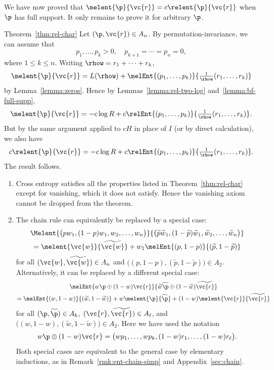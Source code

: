 We have now proved that $\melent{\p}{\vc{r}} = c\relent{\p}{\vc{r}}$ when
$\p$ has full support.  It only remains to prove it for arbitrary $\p$. 

\begin{pfof}{Theorem~\ref{thm:rel-char}}
Let $(\p, \vc{r}) \in A_n$.  By permutation-invariance, we can assume that 
\[
p_1, \ldots, p_k > 0, 
\quad
p_{k + 1} = \cdots = p_n = 0,
\]
where $1 \leq k \leq n$.  Writing $\rhow = r_1 + \cdots + r_k$,
\[
\melent{\p}{\vc{r}}     
=
L(\rhow) 
+ \melEnt{(p_1, \ldots, p_k)}{\tfrac{1}{\rhow}(r_1, \ldots, r_k)}
\]
by Lemma~\ref{lemma:zeros}.  Hence by Lemmas~\ref{lemma:rel-two-log}
and~\ref{lemma:bf-full-supp},
\[
\melent{\p}{\vc{r}}     
=
-c\log R
+ c\relEnt{(p_1, \ldots, p_k)}{\tfrac{1}{\rhow}(r_1, \ldots, r_k)}.
\]
But by the same argument applied to $cH$ in place of $I$ (or by direct
calculation), we also have
\[
c\relent{\p}{\vc{r}}     
=
-c\log R
+ c\relEnt{(p_1, \ldots, p_k)}{\tfrac{1}{\rhow}(r_1, \ldots, r_k)}.
\]
The result follows.
\end{pfof}

\begin{remarks}
\begin{enumerate}
\item 
Cross entropy satisfies all the properties listed in
Theorem~\ref{thm:rel-char} except for vanishing,
which it does not satisfy.  Hence the vanishing axiom cannot be dropped
from the theorem.

\item
{}
The chain%
%
% 
rule can equivalently be replaced by a special case: 
% 
\begin{multline*}
\Melent{\bigl(pw_1, (1 - p)w_1, w_2, \ldots, w_n\bigr)}%
{\bigl(\widetilde{p}\widetilde{w}_1, (1 - \widetilde{p})\widetilde{w}_1, 
\widetilde{w}_2, \ldots, \widetilde{w}_n\bigr)}      \\ 
=
\melent{\vc{w}}{\widetilde{\vc{w}}} 
+
w_1 \melEnt{(p, 1 - p)}{(\widetilde{p}, 1 - \widetilde{p})}
\end{multline*}
% 
for all $(\vc{w}, \widetilde{\vc{w}}) \in A_n$ and $\bigl((p, 1 - p),
(\widetilde{p}, 1 - \widetilde{p})\bigr) \in A_2$.  Alternatively, it can
be replaced by a different special case:
% 
\begin{multline*}
\melEnt{w\p \oplus (1 - w)\vc{r}}%
{\widetilde{w}\widetilde{\p} \oplus (1 - \widetilde{w})\widetilde{\vc{r}}}%
\\
=
\melEnt{(w, 1 - w)}{(\widetilde{w}, 1 - \widetilde{w})}
+
w\melent{\p}{\widetilde{\p}}
+
(1 - w)\melent{\vc{r}}{\widetilde{\vc{r}}}
\end{multline*}
% 
for all $(\p, \widetilde{\p}) \in A_k$, $(\vc{r}, \widetilde{\vc{r}}) \in
A_\ell$, and $\bigl((w, 1 - w), (\widetilde{w}, 1 - \widetilde{w})\bigr)
\in A_2$.  Here we have used the notation
\[
w\p \oplus (1 - w)\vc{r}
=
\bigl(w p_1, \ldots, w p_k, (1 - w)r_1, \ldots, (1 - w)r_\ell\bigr).
\]
Both special cases are equivalent to the general case by elementary
inductions, as in Remark~\ref{rmk:ent-chain-simp} and
Appendix~\ref{sec:chain}.
\end{enumerate}
\end{remarks}


